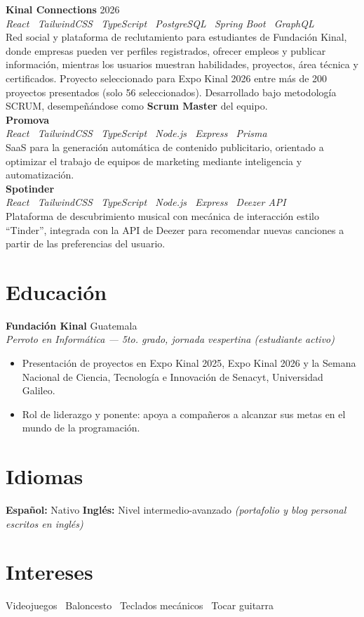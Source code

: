 \documentclass[10.5pt,a4paper]{article}
\newcommand{\projectitem}[4]{%
  \textbf{\color{darknavy}#1} \hfill {\small\color{graytext}#2}\\
  {\small\color{accent}\textit{#3}}\\[2pt]
  #4\\[6pt]
}
\begin{document}
\projectitem{Kinal Connections}{2026}
{React \textbar\ TailwindCSS \textbar\ TypeScript \textbar\ PostgreSQL \textbar\ Spring Boot \textbar\ GraphQL}
{Red social y plataforma de reclutamiento para estudiantes de Fundación Kinal, donde empresas pueden ver perfiles registrados, ofrecer empleos y publicar información, mientras los usuarios muestran habilidades, proyectos, área técnica y certificados. Proyecto seleccionado para Expo Kinal 2026 entre más de 200 proyectos presentados (solo 56 seleccionados). Desarrollado bajo metodología SCRUM, desempeñándose como \textbf{Scrum Master} del equipo.}

\projectitem{Promova}{}
{React \textbar\ TailwindCSS \textbar\ TypeScript \textbar\ Node.js \textbar\ Express \textbar\ Prisma}
{SaaS para la generación automática de contenido publicitario, orientado a optimizar el trabajo de equipos de marketing mediante inteligencia y automatización.}

\projectitem{Spotinder}{}
{React \textbar\ TailwindCSS \textbar\ TypeScript \textbar\ Node.js \textbar\ Express \textbar\ Deezer API}
{Plataforma de descubrimiento musical con mecánica de interacción estilo ``Tinder'', integrada con la API de Deezer para recomendar nuevas canciones a partir de las preferencias del usuario.}

\section*{Educación}
\textbf{\color{darknavy}Fundación Kinal} \hfill {\small\color{graytext}Guatemala}\\
{\small\color{accent}\textit{Perroto en Informática — 5to. grado, jornada vespertina (estudiante activo)}}\\[3pt]
\begin{itemize}[leftmargin=14pt, itemsep=1pt, topsep=3pt]
  \item Presentación de proyectos en Expo Kinal 2025, Expo Kinal 2026 y la Semana Nacional de Ciencia, Tecnología e Innovación de Senacyt, Universidad Galileo.
  \item Rol de liderazgo y ponente: apoya a compañeros a alcanzar sus metas en el mundo de la programación.
\end{itemize}

\section*{Idiomas}
\textbf{\color{darknavy}Español:} Nativo \quad\textbar\quad \textbf{\color{darknavy}Inglés:} Nivel intermedio-avanzado \textit{(portafolio y blog personal escritos en inglés)}

\section*{Intereses}
Videojuegos \textbullet\ Baloncesto \textbullet\ Teclados mecánicos \textbullet\ Tocar guitarra
\end{document}
